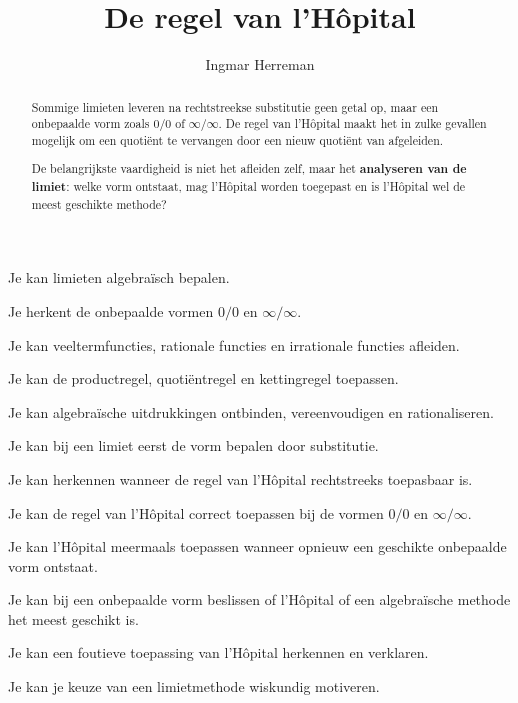 \documentclass{ximera}
\title{De regel van l'Hôpital}
\author{Ingmar Herreman}
\begin{document}

\begin{abstract}
Sommige limieten leveren na rechtstreekse substitutie geen getal op, maar
een onbepaalde vorm zoals \(0/0\) of \(\infty/\infty\).
De regel van l'Hôpital maakt het in zulke gevallen mogelijk om een
quotiënt te vervangen door een nieuw quotiënt van afgeleiden.

De belangrijkste vaardigheid is niet het afleiden zelf, maar het
\textbf{analyseren van de limiet}: welke vorm ontstaat, mag l'Hôpital
worden toegepast en is l'Hôpital wel de meest geschikte methode?
\end{abstract}

\maketitle

\begin{voorkennis}
  \item Je kan limieten algebraïsch bepalen.
  \item Je herkent de onbepaalde vormen \(0/0\) en \(\infty/\infty\).
  \item Je kan veeltermfuncties, rationale functies en irrationale functies afleiden.
  \item Je kan de productregel, quotiëntregel en kettingregel toepassen.
  \item Je kan algebraïsche uitdrukkingen ontbinden, vereenvoudigen en rationaliseren.
\end{voorkennis}

\begin{leerdoelen}
  \item Je kan bij een limiet eerst de vorm bepalen door substitutie.
  \item Je kan herkennen wanneer de regel van l'Hôpital rechtstreeks toepasbaar is.
  \item Je kan de regel van l'Hôpital correct toepassen bij de vormen \(0/0\) en \(\infty/\infty\).
  \item Je kan l'Hôpital meermaals toepassen wanneer opnieuw een geschikte onbepaalde vorm ontstaat.
  \item Je kan bij een onbepaalde vorm beslissen of l'Hôpital of een algebraïsche methode het meest geschikt is.
  \item Je kan een foutieve toepassing van l'Hôpital herkennen en verklaren.
  \item Je kan je keuze van een limietmethode wiskundig motiveren.
\end{leerdoelen}
\end{document}
